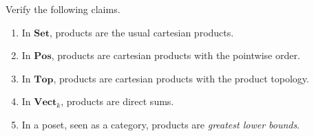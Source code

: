 \documentclass[]{amsbook}
\newcommand{\catname}[1]{\mathbf{#1}}
\newcommand{\0}{\mathbf{0}}
\newcommand{\1}{\mathbf{1}}
\begin{document}
\setcounter{Exercise}{25}
\begin{Exercise}
    Verify the following claims.
    \begin{enumerate}
        \item In $\catname{Set}$, products are the usual cartesian products.
        \item In $\catname{Pos}$, products are cartesian products with the
        pointwise order.
        \item In $\catname{Top}$, products are cartesian products with the
        product topology.
        \item In $\catname{Vect}_k$, products are direct sums.
        \item In a poset, seen as a category, products are \emph{greatest lower
        bounds}.
    \end{enumerate}
\end{Exercise}
\end{document}
